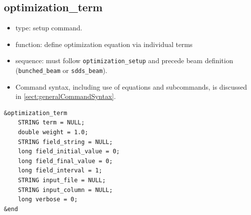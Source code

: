 \documentclass[11pt]{article}
\begin{document}
\subsection{optimization\_term \label{subsec:optimizationterm}}

\begin{itemize}
\item type: setup command.
\item function: define optimization equation via individual terms
\item sequence: must follow \verb|optimization_setup| and precede beam definition (\verb|bunched_beam| or \verb|sdds_beam|).
\item Command syntax, including use of equations and subcommands, is discussed in \ref{sect:generalCommandSyntax}.
\end{itemize}

\begin{verbatim}
&optimization_term
    STRING term = NULL;
    double weight = 1.0;
    STRING field_string = NULL;
    long field_initial_value = 0;
    long field_final_value = 0;
    long field_interval = 1;
    STRING input_file = NULL;
    STRING input_column = NULL;
    long verbose = 0;
&end
\end{verbatim}
\end{document}
